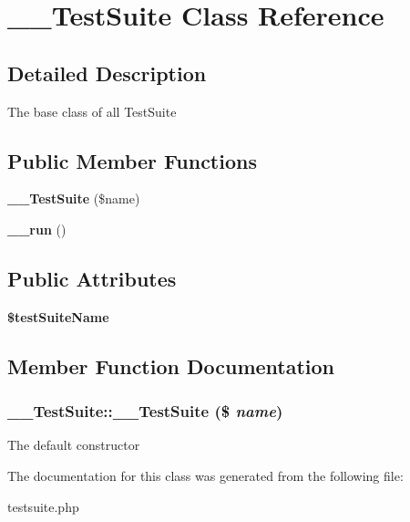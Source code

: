 \section{\_\-\_\-Test\-Suite Class Reference}
\label{class____TestSuite}


\subsection{Detailed Description}
The base class of all Test\-Suite 

\subsection*{Public Member Functions}
\begin{CompactItemize}
\item 
{\bf \_\-\_\-Test\-Suite} (\$name)
\item 
\textbf{\_\-\_\-run} ()\label{class____TestSuite_c2f78f4e0cd824175be687e11b0bcfff}

\end{CompactItemize}
\subsection*{Public Attributes}
\begin{CompactItemize}
\item 
\textbf{\$test\-Suite\-Name}\label{class____TestSuite_a73a48bc7d6c36b9476608b18a505c8c}

\end{CompactItemize}


\subsection{Member Function Documentation}
\subsubsection{\setlength{\rightskip}{0pt plus 5cm}\_\-\_\-Test\-Suite::\_\-\_\-Test\-Suite (\$ {\em name})}\label{class____TestSuite_7429555504cf2b8903959611b7981d6e}


The default constructor 

The documentation for this class was generated from the following file:\begin{CompactItemize}
\item 
testsuite.php\end{CompactItemize}
